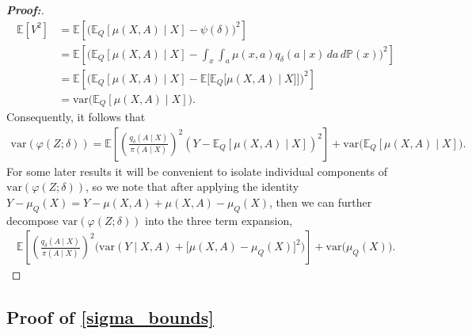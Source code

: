 \documentclass[11pt,twoside]{article}
\newcommand{\var}{\text{var}}
\theoremstyle{definition}
\theoremstyle{remark}
\begin{document}
\begin{proof}[\textbf{Proof:}]
\begin{align*}
    \mathbb{E}[V^2] &= \mathbb{E}\left[\Big( \mathbb{E}_Q\left[\mu(X, A) \mid X \right]  - \psi(\delta) \Big)^2 \right] \\
    &= \mathbb{E}\left[\Big( \mathbb{E}_Q\left[\mu(X, A) \mid X \right]  - \int_x \int_a \mu(x, a) q_\delta(a \mid x) \, da \, d\mathbb{P}(x) \Big)^2 \right] \\
    &= \mathbb{E}\left[\Big( \mathbb{E}_Q\left[\mu(X, A) \mid X \right]  - \mathbb{E}\Big[ \mathbb{E}_Q \big[ \mu(X, A) \mid X\big] \Big] \Big)^2 \right] \\
    &= \var\Big( \mathbb{E}_Q\left[\mu(X, A) \mid X \right] \Big).
\end{align*}
Consequently, it follows that
\begin{align*}
    \var \left( \varphi(Z; \delta) \right) = \mathbb{E}\left[\left(\frac{q_\delta(A \mid X)}{\pi(A \mid X)} \right)^2 (Y - \mathbb{E}_Q\left[\mu(X, A) \mid X \right])^2 \right] + \var\Big( \mathbb{E}_Q\left[\mu(X, A) \mid X \right] \Big).
\end{align*}
For some later results it will be convenient to isolate individual components of $\var \left( \varphi(Z; \delta) \right)$, so we note that after applying the identity $Y - \mu_Q(X) = Y - \mu(X, A) + \mu(X, A) - \mu_Q(X)$, then we can further decompose $\var \left( \varphi(Z; \delta) \right)$ into the three term expansion,
 \begin{align*}
     \mathbb{E}\left[\left(\frac{q_\delta(A \mid X)}{\pi(A \mid X)} \right)^2 \Big( \var\left( Y \mid X, A \right) +  \big[ \mu(X, A) - \mu_Q(X) \big]^2 \Big) \right] + \var\big( \mu_Q(X) \big).
\end{align*}
\end{proof}

\subsection{Proof of \texorpdfstring{\cref{sigma_bounds}}{Lemma 1}} \label{sigma_bounds_proof}
\end{document}

